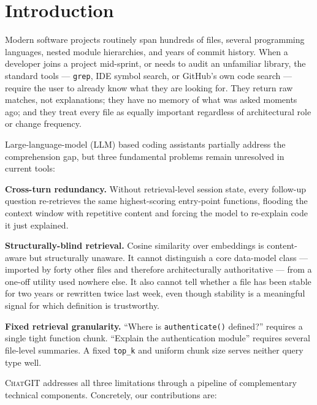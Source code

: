 \documentclass[runningheads]{llncs}
\newcommand{\chatgit}{\textsc{ChatGIT}\xspace}
\begin{document}
\section{Introduction}
\label{sec:intro}

Modern software projects routinely span hundreds of files, several
programming languages, nested module hierarchies, and years of
commit history. When a developer joins a project mid-sprint, or
needs to audit an unfamiliar library, the standard tools ---
\texttt{grep}, IDE symbol search, or GitHub's own code search ---
require the user to already know what they are looking for. They
return raw matches, not explanations; they have no memory of what
was asked moments ago; and they treat every file as equally
important regardless of architectural role or change frequency.

Large-language-model (LLM) based coding assistants partially
address the comprehension gap, but three fundamental problems
remain unresolved in current tools:

\textbf{Cross-turn redundancy.} Without retrieval-level session
state, every follow-up question re-retrieves the same
highest-scoring entry-point functions, flooding the context window
with repetitive content and forcing the model to re-explain code
it just explained.

\textbf{Structurally-blind retrieval.} Cosine similarity over
embeddings is content-aware but structurally unaware. It cannot
distinguish a core data-model class --- imported by forty other
files and therefore architecturally authoritative --- from a
one-off utility used nowhere else. It also cannot tell whether a
file has been stable for two years or rewritten twice last week,
even though stability is a meaningful signal for which definition
is trustworthy.

\textbf{Fixed retrieval granularity.} ``Where is
\texttt{authenticate()} defined?'' requires a single tight
function chunk. ``Explain the authentication module'' requires
several file-level summaries. A fixed \texttt{top\_k} and uniform
chunk size serves neither query type well.

\chatgit addresses all three limitations through a pipeline of
complementary technical components. Concretely, our contributions
are:
\end{document}
